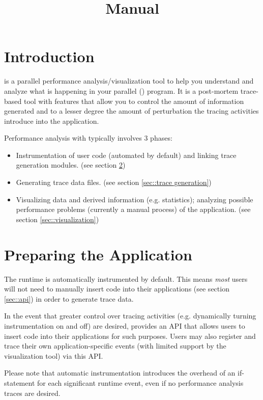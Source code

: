 \documentclass[10pt,dvips]{article}
\title{\projections{} Manual}
\begin{document}
\maketitle

\section{Introduction}

\projections{} is a parallel performance analysis/visualization tool
to help you understand and analyze what is happening in your parallel
(\charmpp{}) program. It is a post-mortem trace-based tool with
features that allow you to control the amount of information generated
and to a lesser degree the amount of perturbation the tracing
activities introduce into the application.

Performance analysis with \projections{} typically involves 3 phases:

\begin{itemize}
\item 
Instrumentation of user code (automated by default) and linking trace
generation modules. (see section \ref{sec::preparation})
\item
Generating trace data files. (see section \ref{sec::trace generation})
\item
Visualizing data and derived information (e.g. statistics); analyzing
possible performance problems (currently a manual process) of the
application. (see section \ref{sec::visualization})
\end{itemize}

\section{Preparing the \charmpp{} Application}
\label{sec::preparation}

The \charmpp{} runtime is automatically instrumented by default. This
means {\em most} users will not need to manually insert code into
their applications (see section \ref{sec::api}) in order to generate
trace data.

In the event that greater control over tracing activities
(e.g. dynamically turning instrumentation on and off) are desired,
\projections{} provides an API that allows users to insert code into
their applications for such purposes. Users may also register and
trace their own application-specific events (with limited support by
the visualization tool) via this API.

Please note that automatic instrumentation introduces the overhead of
an if-statement for each significant runtime event, even if no
performance analysis traces are desired.
\end{document}
